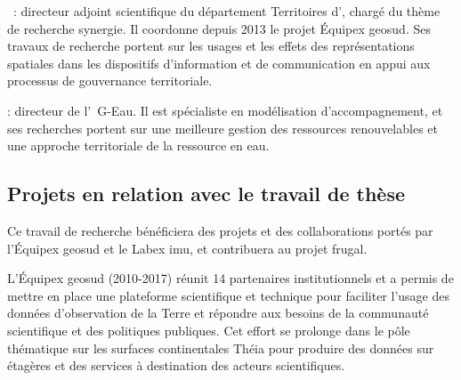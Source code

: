  : directeur adjoint scientifique du département Territoires d'{\IRSTEA}, chargé du thème de recherche {\sc synergie}.
Il coordonne depuis 2013 le projet Équipex {\sc geosud}. Ses travaux de recherche portent sur les usages et les effets
des représentations spatiales dans les dispositifs d'information et de communication en appui aux processus de gouvernance territoriale.

 : directeur de l'{\UMR\ G-Eau}.
Il est spécialiste en modélisation d'accompagnement,
et ses recherches portent sur une meilleure gestion des ressources renouvelables
et une approche territoriale de la ressource en eau.


\subsection{Projets en relation avec le travail de thèse}


Ce travail de recherche bénéficiera des projets et des collaborations portés
par l'Équipex {\sc geosud} et le Labex {\sc imu},
et contribuera au projet {\sc frugal}.

L'Équipex {\sc geosud} (2010-2017) réunit 14 partenaires institutionnels et a permis de mettre en place une plateforme
scientifique et technique pour faciliter l'usage des données d'observation de la Terre et répondre aux besoins
de la communauté scientifique et des politiques publiques.
Cet effort se prolonge dans le pôle thématique sur les surfaces continentales Théia
pour produire des données sur étagères et des services à destination des acteurs scientifiques.

